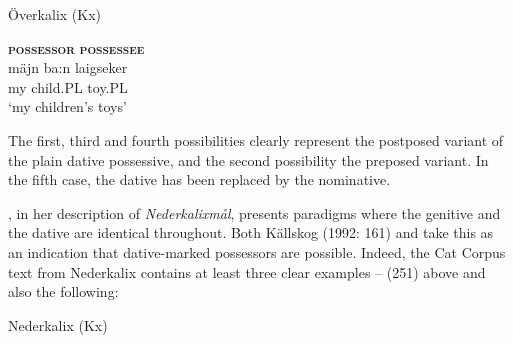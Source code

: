 

\item 

Överkalix (Kx)



 \ea\label{}
\gll \textbf{\textsc{possessor}} \textbf{\textsc{possessee}}\\

 \ea\label{}
\gll mäjn  ba:n  laigseker\\


my  child.PL  toy.PL\\

\glt ‘my children’s toys’

\z

The first, third and fourth possibilities clearly represent the postposed variant of the plain dative possessive, and the second possibility the preposed variant. In the fifth case, the dative has been replaced by the nominative.  


\citet{Rutberg1924}, in her description of \textit{Nederkalixmål}, presents paradigms where the genitive and the dative are identical throughout. Both Källskog (1992: 161) and \citet[42]{Delsing2003a} take this as an indication that dative-marked possessors are possible. Indeed, the Cat Corpus text from Nederkalix contains at least three clear examples – (251) above and also the following:


\item 

Nederkalix (Kx)



